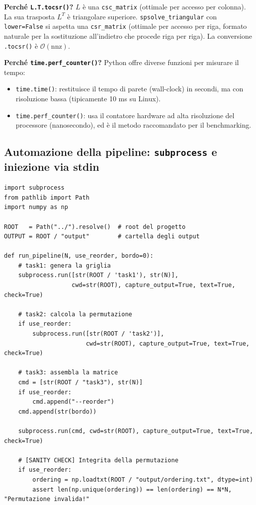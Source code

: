 \documentclass[a4paper,11pt]{article}
\theoremstyle{definition}
\begin{document}
\textbf{Perché \texttt{L.T.tocsr()}?} $L$ è una \texttt{csc\_matrix} (ottimale per accesso per colonna). La sua trasposta $L^T$ è triangolare superiore. \texttt{spsolve\_triangular} con \texttt{lower=False} si aspetta una \texttt{csr\_matrix} (ottimale per accesso per riga, formato naturale per la sostituzione all'indietro che procede riga per riga). La conversione \texttt{.tocsr()} è $\mathcal{O}(\text{nnz})$.

\textbf{Perché \texttt{time.perf\_counter()}?} Python offre diverse funzioni per misurare il tempo:
\begin{itemize}
  \item \texttt{time.time()}: restituisce il tempo di parete (wall-clock) in secondi, ma con risoluzione bassa (tipicamente 10 ms su Linux).
  \item \texttt{time.perf\_counter()}: usa il contatore hardware ad alta risoluzione del processore (nanosecondo), ed è il metodo raccomandato per il benchmarking.
\end{itemize}

\subsection{Automazione della pipeline: \texttt{subprocess} e iniezione via stdin}

\begin{lstlisting}[style=python, caption={run\_pipeline: orchestrazione dei moduli C++ da Python tramite argv}]
import subprocess
from pathlib import Path
import numpy as np

ROOT   = Path("../").resolve()  # root del progetto
OUTPUT = ROOT / "output"        # cartella degli output

def run_pipeline(N, use_reorder, bordo=0):
    # task1: genera la griglia
    subprocess.run([str(ROOT / 'task1'), str(N)],
                   cwd=str(ROOT), capture_output=True, text=True, check=True)
    
    # task2: calcola la permutazione
    if use_reorder:
        subprocess.run([str(ROOT / 'task2')], 
                       cwd=str(ROOT), capture_output=True, text=True, check=True)
    
    # task3: assembla la matrice
    cmd = [str(ROOT / "task3"), str(N)]
    if use_reorder:
        cmd.append("--reorder")
    cmd.append(str(bordo))
    
    subprocess.run(cmd, cwd=str(ROOT), capture_output=True, text=True, check=True)
    
    # [SANITY CHECK] Integrita della permutazione
    if use_reorder:
        ordering = np.loadtxt(ROOT / "output/ordering.txt", dtype=int)
        assert len(np.unique(ordering)) == len(ordering) == N*N, "Permutazione invalida!"
\end{lstlisting}
\end{document}
